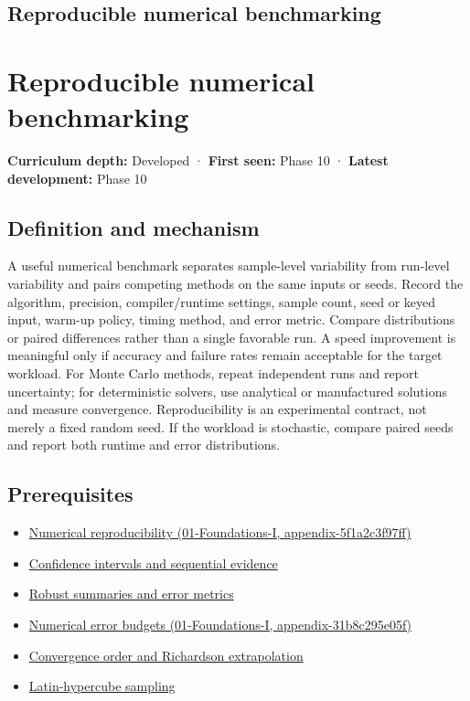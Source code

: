\hypertarget{appendix-b9db93e28371}{}
\section*{Reproducible numerical benchmarking}
\chapter{Reproducible numerical benchmarking}\label{appendix-b9db93e28371-reproducible-numerical-benchmarking}

\textbf{Curriculum depth:} Developed · \textbf{First seen:} Phase 10 · \textbf{Latest development:} Phase 10

\section{Definition and mechanism}\label{appendix-b9db93e28371-definition-and-mechanism}

A useful numerical benchmark separates sample-level variability from run-level variability and pairs competing methods on the same inputs or seeds. Record the algorithm, precision, compiler/runtime settings, sample count, seed or keyed input, warm-up policy, timing method, and error metric. Compare distributions or paired differences rather than a single favorable run. A speed improvement is meaningful only if accuracy and failure rates remain acceptable for the target workload. For Monte Carlo methods, repeat independent runs and report uncertainty; for deterministic solvers, use analytical or manufactured solutions and measure convergence. Reproducibility is an experimental contract, not merely a fixed random seed. If the workload is stochastic, compare paired seeds and report both runtime and error distributions.

\section{Prerequisites}\label{appendix-b9db93e28371-prerequisites}

\begin{itemize}
\tightlist
\item
  \href{../01-Foundations-I/main.pdf\#nameddest=appendix-5f1a2c3f97ff}{Numerical reproducibility (01-Foundations-I, appendix-5f1a2c3f97ff)}
\item
  \hyperref[appendix-c83016554b1e]{Confidence intervals and sequential evidence}
\item
  \hyperref[appendix-bcc44e9d3d02]{Robust summaries and error metrics}
\item
  \href{../01-Foundations-I/main.pdf\#nameddest=appendix-31b8c295e05f}{Numerical error budgets (01-Foundations-I, appendix-31b8c295e05f)}
\item
  \hyperref[appendix-aca80b6bf17a]{Convergence order and Richardson extrapolation}
\item
  \hyperref[appendix-1c5e85693a06]{Latin-hypercube sampling}
\end{itemize}

